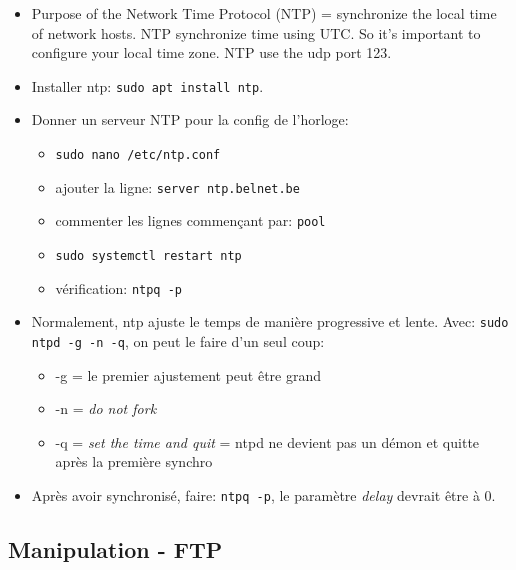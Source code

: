 \documentclass[a4paper]{article}
\begin{document}
\begin{itemize}

\item Purpose of the Network Time Protocol (NTP) = synchronize the local time of network hosts. NTP synchronize time using UTC. So it's important to configure your local time zone. NTP use the udp port 123.

\item Installer ntp: \texttt{sudo apt install ntp}.

\item Donner un serveur NTP pour la config de l'horloge:
\begin{example}
    \begin{itemize}
        \item \texttt{sudo nano /etc/ntp.conf}
        \item ajouter la ligne: \texttt{server ntp.belnet.be}
        \item commenter les lignes commençant par: \texttt{pool}
        \item \texttt{sudo systemctl restart ntp}
        \item vérification: \texttt{ntpq -p}
    \end{itemize}
\end{example}

\item Normalement, ntp ajuste le temps de manière progressive et lente. Avec: \texttt{sudo ntpd -g -n -q}, on peut le faire d'un seul coup:
\begin{itemize}
    \item -g = le premier ajustement peut être grand
    \item -n = \textit{do not fork}
    \item -q = \textit{set the time and quit} = ntpd ne devient pas un démon et quitte après la première synchro
\end{itemize}

\item Après avoir synchronisé, faire: \texttt{ntpq -p}, le paramètre \textit{delay} devrait être à 0.

\end{itemize}










\subsection{Manipulation - FTP}
\end{document}

